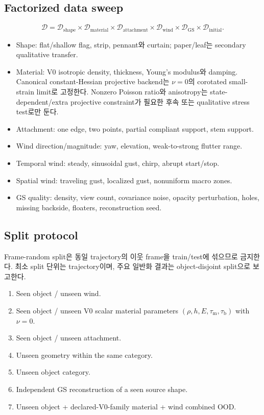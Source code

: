 \documentclass[11pt,a4paper]{article}
\begin{document}
\subsection{Factorized data sweep}

\begin{equation}
  \mathcal D
  =
  \mathcal D_{\mathrm{shape}}
  \times\mathcal D_{\mathrm{material}}
  \times\mathcal D_{\mathrm{attachment}}
  \times\mathcal D_{\mathrm{wind}}
  \times\mathcal D_{\mathrm{GS}}
  \times\mathcal D_{\mathrm{initial}}.
\end{equation}

\begin{itemize}[leftmargin=1.5em]
  \item Shape: flat/shallow flag, strip, pennant와 curtain; paper/leaf는 secondary qualitative transfer.
  \item Material: V0 isotropic density, thickness, Young's modulus와 damping.
  Canonical constant-Hessian projective backend는 \(\nu=0\)의 corotated small-strain limit로 고정한다.
  Nonzero Poisson ratio와 anisotropy는 state-dependent/extra projective constraint가 필요한
  후속 또는 qualitative stress test로만 둔다.
  \item Attachment: one edge, two points, partial compliant support, stem support.
  \item Wind direction/magnitude: yaw, elevation, weak-to-strong flutter range.
  \item Temporal wind: steady, sinusoidal gust, chirp, abrupt start/stop.
  \item Spatial wind: traveling gust, localized gust, nonuniform macro zones.
  \item GS quality: density, view count, covariance noise, opacity perturbation,
  holes, missing backside, floaters, reconstruction seed.
\end{itemize}

\subsection{Split protocol}

Frame-random split은 동일 trajectory의 이웃 frame을 train/test에 섞으므로 금지한다.
최소 split 단위는 trajectory이며, 주요 일반화 결과는 object-disjoint split으로 보고한다.

\begin{enumerate}[leftmargin=1.7em]
  \item Seen object / unseen wind.
  \item Seen object / unseen V0 scalar material parameters
  \((\rho,h,E,\tau_{\mathrm m},\tau_{\mathrm b})\) with \(\nu=0\).
  \item Seen object / unseen attachment.
  \item Unseen geometry within the same category.
  \item Unseen object category.
  \item Independent GS reconstruction of a seen source shape.
  \item Unseen object + declared-V0-family material + wind combined OOD.
\end{enumerate}
\end{document}
